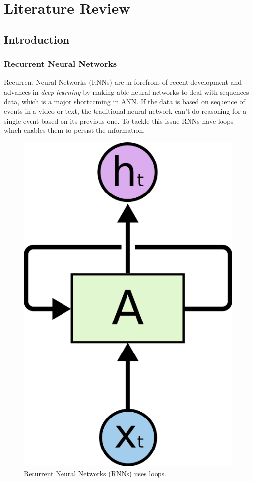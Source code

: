 \chapter{Literature Review}
\label{chap:lit.review}

\section{Introduction}

\subsection{Recurrent Neural Networks}

Recurrent Neural Networks (RNNs) are in forefront of recent development and advances in \textit{deep learning} by making able neural networks to deal with sequences data, which is a major shortcoming in ANN. If the data is based on sequence of events in a video or text, the traditional neural network can't do reasoning for a single event based on its previous one. To tackle this issue RNNs have loops which enables them to persist the information.

\begin{figure}
	\centering
	\includegraphics[scale=0.4]{./figs/rnn-rolled}
	\caption[A Rolled Recurrent Neural Networks]{Recurrent Neural Networks (RNNs) uses loops.}
	\label{fig:rnn-rolled}
\end{figure}

